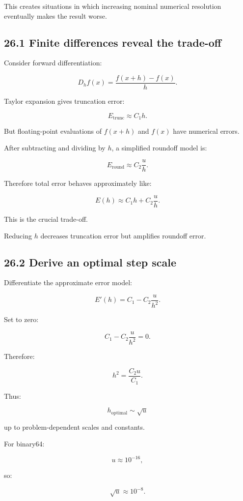 This creates situations in which increasing nominal numerical resolution eventually makes the result worse.

\subsection{26.1 Finite differences reveal the trade-off}\label{02-foundations-ii-ch029-finite-differences-reveal-the-trade-off}

Consider forward differentiation:

\[ D_hf(x)= \frac{f(x+h)-f(x)}{h}. \]

Taylor expansion gives truncation error:

\[ \boxed{ E_{\mathrm{trunc}}\approx C_1h }. \]

But floating-point evaluations of \(f(x+h)\) and \(f(x)\) have numerical errors.

After subtracting and dividing by \(h\), a simplified roundoff model is:

\[ \boxed{ E_{\mathrm{round}}\approx C_2\frac uh }. \]

Therefore total error behaves approximately like:

\[ \boxed{ E(h)\approx C_1h+C_2\frac uh }. \]

This is the crucial trade-off.

Reducing \(h\) decreases truncation error but amplifies roundoff error.

\subsection{26.2 Derive an optimal step scale}\label{02-foundations-ii-ch029-derive-an-optimal-step-scale}

Differentiate the approximate error model:

\[ E'(h)=C_1-C_2\frac u{h^2}. \]

Set to zero:

\[ C_1-C_2\frac u{h^2}=0. \]

Therefore:

\[ h^2=\frac{C_2u}{C_1}. \]

Thus:

\[ \boxed{ h_{\mathrm{optimal}} \sim\sqrt u } \]

up to problem-dependent scales and constants.

For binary64:

\[ u\approx10^{-16}, \]

so:

\[ \sqrt u\approx10^{-8}. \]

